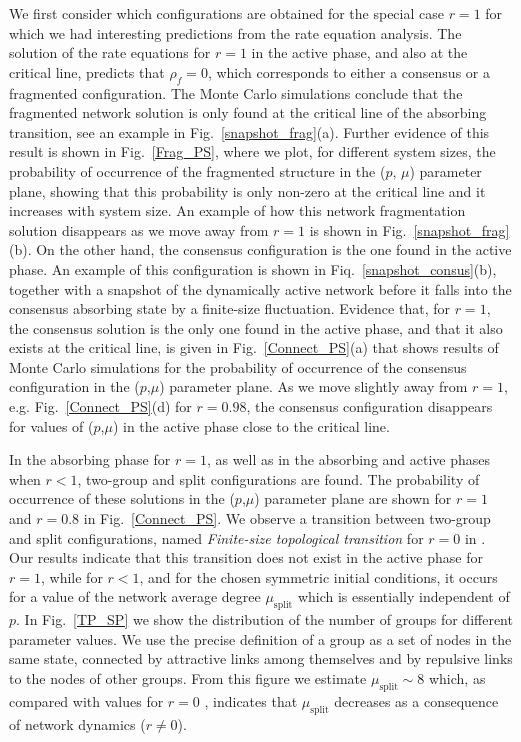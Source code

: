 \documentclass[aps,pre,notitlepage]{revtex4-1}
\begin{document}
We first consider which configurations are obtained for the special case $r=1$ for which we had interesting predictions from the rate equation analysis. The solution of the rate equations for $r=1$ in the active phase, and also at the critical line, predicts that $\rho_f=0$, which corresponds to either a consensus or a fragmented configuration. The Monte Carlo simulations conclude that the fragmented network solution is only found at the critical line of the absorbing transition, see an example in Fig.~\ref{snapshot_frag}(a). Further evidence of this result is shown in Fig.~\ref{Frag_PS}, where we plot, for different system sizes, the probability of occurrence of the fragmented structure in the ($p,\,\mu$) parameter plane, showing that this probability is only non-zero at the critical line and it increases with system size. An example of how this network fragmentation solution disappears as we move away from $r=1$ is shown in Fig.~\ref{snapshot_frag}(b). On the other hand, the consensus configuration is the one found in the active phase. An example of this configuration is shown in Fiq.~\ref{snapshot_consus}(b), together with a snapshot of the dynamically active network before it falls into the consensus absorbing state by a finite-size fluctuation. Evidence that, for $r=1$, the consensus solution is the only one found in the active phase, and that it also exists at the critical line, is given in Fig.~\ref{Connect_PS}(a)
that shows results of Monte Carlo simulations for the probability of occurrence of the consensus configuration in the ($p$,$\mu$)
parameter plane. As we move slightly away from $r=1$, e.g. Fig.~\ref{Connect_PS}(d) for $r=0.98$, the consensus configuration disappears for values of ($p$,$\mu$) in the active phase close to the critical line.


In the absorbing phase for $r=1$, as well as in the absorbing and active phases when $r<1$, two-group and split configurations are found. The probability of occurrence of these solutions in the ($p$,$\mu$) parameter plane are shown for $r=1$ and $r=0.8$ in Fig.~\ref{Connect_PS}. We observe a transition between two-group and split configurations, named \emph{Finite-size topological transition} for $r=0$ in \cite{saeedian2019absorbing}. Our results indicate that this transition does not exist in the active phase for $r=1$, while for $r<1$, and for the chosen symmetric initial conditions, it occurs for a value of the network average degree $\mu_\text{split}$ which is essentially independent of $p$. In Fig.~\ref{TP_SP} we show the distribution of the number of groups for different parameter values. We use the precise definition of a group as a set of nodes in the same state, connected by attractive links among themselves and by repulsive links to the nodes of other groups. From this figure we estimate $\mu_\text{split}\sim 8$ which, as compared with values for $r=0$ \cite{saeedian2019absorbing}, indicates that $\mu_\text{split}$ decreases as a consequence of network dynamics ($r\neq 0$).
\end{document}
